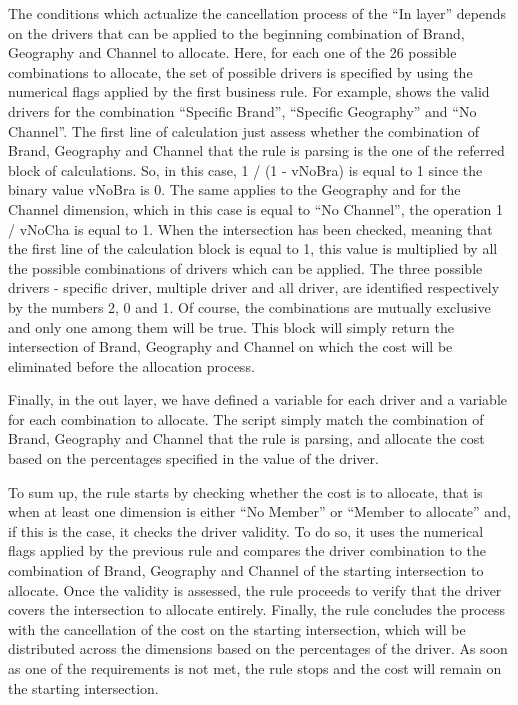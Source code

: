 \documentclass[12pt,a4paper,openright,twoside]{book}
\begin{document}


The conditions which actualize the cancellation process of the ``In layer'' depends on the drivers that can be applied to the beginning combination of Brand, Geography and Channel to allocate.
%
Here, for each one of the 26 possible combinations to allocate, the set of possible drivers is specified by using the numerical flags applied by the first business rule.
%
For example,  shows the valid drivers for the combination ``Specific Brand'', ``Specific Geography'' and ``No Channel''.
%
The first line of calculation just assess whether the combination of Brand, Geography and Channel that the rule is parsing is the one of the referred block of calculations.
%
So, in this case, 1 / (1 - vNoBra) is equal to 1 since the binary value vNoBra is 0.
%
The same applies to the Geography and for the Channel dimension, which in this case is equal to ``No Channel'', the operation 1 / vNoCha is equal to 1.
%
When the intersection has been checked, meaning that the first line of the calculation block is equal to 1, this value is multiplied by all the possible combinations of drivers which can be applied.
%
The three possible drivers - specific driver, multiple driver and all driver, are identified respectively by the numbers 2, 0 and 1.
%
Of course, the combinations are mutually exclusive and only one among them will be true.
%
This block will simply return the intersection of Brand, Geography and Channel on which the cost will be eliminated before the allocation process.

Finally, in the out layer, we have defined a variable for each driver and a variable for each combination to allocate.
%
The script simply match the combination of Brand, Geography and Channel that the rule is parsing, and allocate the cost based on the percentages specified in the value of the driver.

To sum up, the rule starts by checking whether the cost is to allocate, that is when at least one dimension is either ``No Member'' or ``Member to allocate'' and, if this is the case, it checks the driver validity.
%
To do so, it uses the numerical flags applied by the previous rule and compares the driver combination to the combination of Brand, Geography and Channel of the starting intersection to allocate.
%
Once the validity is assessed, the rule proceeds to verify that the driver covers the intersection to allocate entirely.
%
Finally, the rule concludes the process with the cancellation of the cost on the starting intersection, which will be distributed across the dimensions based on the percentages of the driver.
%
As soon as one of the requirements is not met, the rule stops and the cost will remain on the starting intersection.
\end{document}
